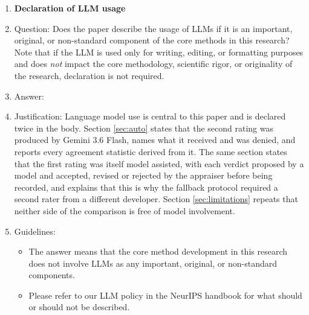 \documentclass{article}
\begin{document}
\begin{enumerate}
\item {\bf Declaration of LLM usage}
    \item[] Question: Does the paper describe the usage of LLMs if it is an important, original, or non-standard component of the core methods in this research? Note that if the LLM is used only for writing, editing, or formatting purposes and does \emph{not} impact the core methodology, scientific rigor, or originality of the research, declaration is not required.
    \item[] Answer: \answerYes{}
    \item[] Justification: Language model use is central to this paper and is declared twice in the body. Section \ref{sec:auto} states that the second rating was produced by Gemini 3.6 Flash, names what it received and was denied, and reports every agreement statistic derived from it. The same section states that the first rating was itself model assisted, with each verdict proposed by a model and accepted, revised or rejected by the appraiser before being recorded, and explains that this is why the fallback protocol required a second rater from a different developer. Section \ref{sec:limitations} repeats that neither side of the comparison is free of model involvement.
    \item[] Guidelines:
    \begin{itemize}
        \item The answer \answerNA{} means that the core method development in this research does not involve LLMs as any important, original, or non-standard components.
        \item Please refer to our LLM policy in the NeurIPS handbook for what should or should not be described.
    \end{itemize}

\end{enumerate}
\end{document}
